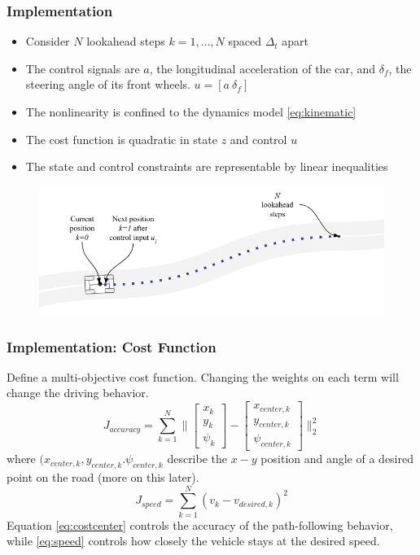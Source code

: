 \documentclass{beamer}
\begin{document}
\begin{frame}
\frametitle{Implementation}
\begin{itemize}
\item Consider $N$ lookahead steps $k=1,\dots,N$ spaced $\Delta_t$ apart
\item The control signals are $a$, the longitudinal acceleration of the car, and $\delta_f$, the steering angle of its front wheels. $u = [a\ \delta_f]$
\item The nonlinearity is confined to the dynamics model \eqref{eq:kinematic}
\item The cost function is quadratic in state $z$ and control $u$
\item The state and control constraints are representable by linear inequalities
\end{itemize}
\vspace{-1.0em}
\begin{figure}
	\includegraphics[width=0.9\linewidth]{figures/mpc_figure.png}
\end{figure}
\end{frame}



\begin{frame}
\frametitle{Implementation: Cost Function}
Define a multi-objective cost function. Changing the weights on each term will change the driving behavior.
\begin{equation}
J_{accuracy} = \sum_{k=1}^N\Big\| \begin{bmatrix}
x_k\\y_k\\\psi_k
\end{bmatrix} - \begin{bmatrix}
x_{center,k}\\y_{center,k}\\\psi_{center,k}
\end{bmatrix} \Big\|_2^2
\label{eq:costcenter}
\end{equation}
where $(x_{center,k}, y_{center,k}. \psi_{center,k}$ describe the $x-y$ position and angle of a desired point on the road (more on this later).
\begin{equation}
J_{speed} = \sum_{k=1}^N (v_k - v_{desired,k})^2
\label{eq:speed}
\end{equation}
Equation \eqref{eq:costcenter} controls the accuracy of the path-following behavior, while \eqref{eq:speed} controls how closely the vehicle stays at the desired speed.
\end{frame}
\end{document}
